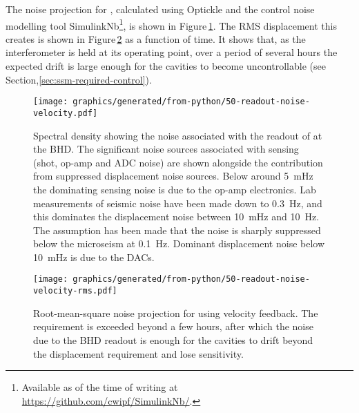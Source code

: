 The noise projection for \LMINUS{}, calculated using Optickle and the control noise modelling tool SimulinkNb\footnote{Available as of the time of writing at \url{https://github.com/cwipf/SimulinkNb/}.}, is shown in Figure\,\ref{fig:readout-noise-velocity}. The \gls{RMS} \LMINUS{} displacement this creates is shown in Figure\,\ref{fig:readout-noise-velocity-rms} as a function of time. It shows that, as the interferometer is held at its operating point, over a period of several hours the expected drift is large enough for the cavities to become uncontrollable (see Section,\ref{sec:ssm-required-control}).

\begin{figure}
  \centering
  \texttt{[image: graphics/generated/from-python/50-readout-noise-velocity.pdf]}
  \caption[Noise projection for \LMINUS{} using velocity feedback]{\label{fig:readout-noise-velocity}Spectral density showing the noise associated with the readout of \LMINUS{} at the BHD. The significant noise sources associated with sensing (shot, op-amp and ADC noise) are shown alongside the contribution from suppressed displacement noise sources. Below around \SI{5}{\milli\hertz} the dominating sensing noise is due to the op-amp electronics. Lab measurements of seismic noise have been made down to \SI{0.3}{\hertz}, and this dominates the displacement noise between \SI{10}{\milli\hertz} and \SI{10}{\hertz}. The assumption has been made that the noise is sharply suppressed below the microseism at \SI{0.1}{\hertz}. Dominant displacement noise below \SI{10}{\milli\hertz} is due to the \glspl{DAC}.}
\end{figure}

\begin{figure}
  \centering
  \texttt{[image: graphics/generated/from-python/50-readout-noise-velocity-rms.pdf]}
  \caption[Root-mean-square noise projection for \LMINUS{} using velocity feedback]{\label{fig:readout-noise-velocity-rms}Root-mean-square noise projection for \LMINUS{} using velocity feedback. The requirement is exceeded beyond a few hours, after which the noise due to the BHD readout is enough for the cavities to drift beyond the displacement requirement and lose sensitivity.}
\end{figure}

